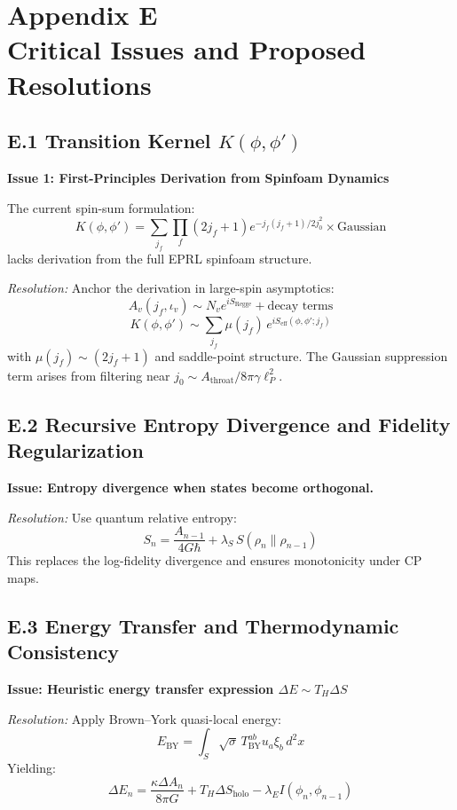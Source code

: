 \section*{Appendix E\\Critical Issues and Proposed Resolutions}
\label{appendix:E}

\subsection*{E.1 Transition Kernel $K(\phi, \phi')$}

\textbf{Issue 1: First-Principles Derivation from Spinfoam Dynamics}

The current spin-sum formulation:
\[
K(\phi, \phi') = \sum_{j_f} \prod_f (2j_f+1) e^{-j_f(j_f+1)/2j_0^2} \times \text{Gaussian}
\]
lacks derivation from the full EPRL spinfoam structure.

\textit{Resolution:}  
Anchor the derivation in large-spin asymptotics:
\[
A_v(j_f, \iota_v) \sim N_v e^{i S_{\text{Regge}}} + \text{decay terms}
\]
\[
K(\phi, \phi') \sim \sum_{j_f} \mu(j_f) \, e^{i S_{\text{eff}}(\phi, \phi'; j_f)}
\]
with \( \mu(j_f) \sim (2j_f+1) \) and saddle-point structure. The Gaussian suppression term arises from filtering near \( j_0 \sim A_{\text{throat}} / 8\pi\gamma\ell_P^2 \).

\subsection*{E.2 Recursive Entropy Divergence and Fidelity Regularization}

\textbf{Issue: Entropy divergence when states become orthogonal.}

\textit{Resolution:}  
Use quantum relative entropy:
\[
S_n = \frac{A_{n-1}}{4G\hbar} + \lambda_S \, S(\rho_n \| \rho_{n-1})
\]
This replaces the log-fidelity divergence and ensures monotonicity under CP maps.

\subsection*{E.3 Energy Transfer and Thermodynamic Consistency}

\textbf{Issue: Heuristic energy transfer expression \( \Delta E \sim T_H \Delta S \)}

\textit{Resolution:}  
Apply Brown–York quasi-local energy:
\[
E_{\text{BY}} = \int_S \sqrt{\sigma} \, T^{ab}_{\text{BY}} u_a \xi_b \, d^2x
\]
Yielding:
\[
\Delta E_n = \frac{\kappa \Delta A_n}{8\pi G} + T_H \Delta S_{\text{holo}} - \lambda_E I(\phi_n, \phi_{n-1})
\]

